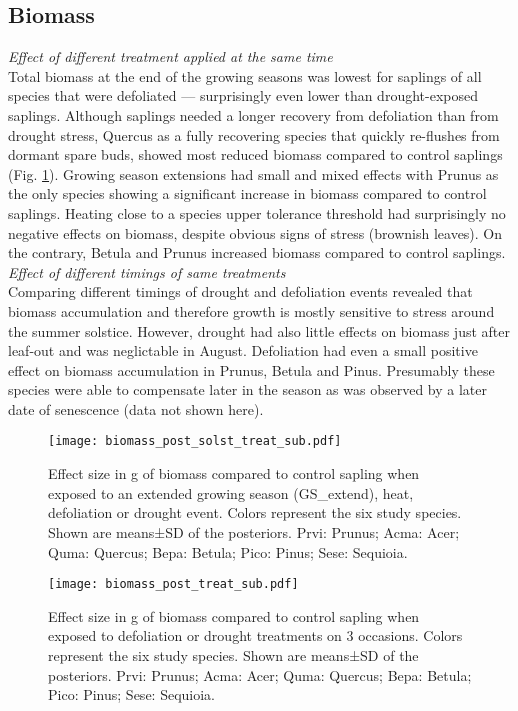 \documentclass{article}
\begin{document}
			\subsection*{Biomass}
			\textit{Effect of different treatment applied at the same time}\\
			Total biomass at the end of the growing seasons was lowest for saplings of all species that were defoliated --- surprisingly even lower than drought-exposed saplings. Although saplings needed a longer recovery from defoliation than from drought stress, Quercus as a fully recovering species that quickly re-flushes from dormant spare buds, showed most reduced biomass compared to control saplings (Fig. \ref{fig:biomass_post_solst_treat_sub}). Growing season extensions had small and mixed effects with Prunus as the only species showing a significant increase in biomass compared to control saplings. Heating close to a species upper tolerance threshold had surprisingly no negative effects on biomass, despite obvious signs of stress (brownish leaves). On the contrary, Betula and Prunus increased biomass compared to control saplings.
			\\
			
			\textit{Effect of different timings of same treatments}\\
			Comparing different timings of drought and defoliation events revealed that biomass accumulation and therefore growth is mostly sensitive to stress around the summer solstice. However, drought had also little effects on biomass just after leaf-out and was neglictable in August. Defoliation had even a small positive effect on biomass accumulation in Prunus, Betula and Pinus. Presumably these species were able to compensate later in the season as was observed by a later date of senescence (data not shown here).
			\\
			
				
			\begin{figure}[H]
				\centering
				\texttt{[image: biomass\_post\_solst\_treat\_sub.pdf]} 
				\caption{Effect size in g of biomass compared to control sapling when exposed to an extended growing season (GS\_extend), heat, defoliation or drought event. Colors represent the six study species. Shown are means±SD of the posteriors. Prvi: Prunus; Acma: Acer; Quma: Quercus; Bepa: Betula; Pico: Pinus; Sese: Sequioia.}
				\label{fig:biomass_post_solst_treat_sub}
			\end{figure}
			
							\begin{figure}[H]
				\centering
				\texttt{[image: biomass\_post\_treat\_sub.pdf]} 
				\caption{Effect size in g of biomass compared to control sapling when exposed to defoliation or drought treatments on 3 occasions. Colors represent the six study species. Shown are means±SD of the posteriors. Prvi: Prunus; Acma: Acer; Quma: Quercus; Bepa: Betula; Pico: Pinus; Sese: Sequioia.}
				\label{fig:biomass_post_treat_sub}
			\end{figure}
			
\end{document}
